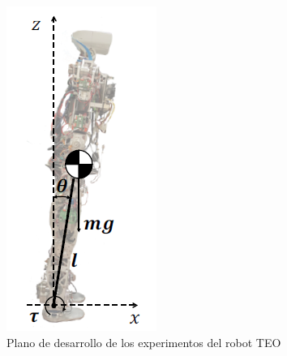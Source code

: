 \begin{figure}[H]
\centering
\includegraphics[scale=0.65]{imagenes/apartado_5/53_postura_inicial_experimental_teo}
\caption{Plano de desarrollo de los experimentos del robot TEO}
\label{figura53}
\end{figure}


